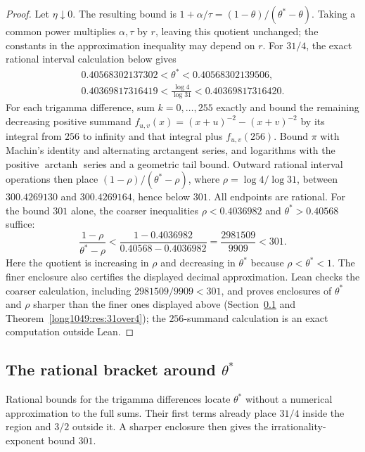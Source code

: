 \documentclass[11pt]{article}
\begin{document}
\begin{proof}
Let $\eta\downarrow0$.  The resulting bound is
$1+\alpha/\tau=(1-\theta)/(\theta^*-\theta)$.
Taking a common power multiplies $\alpha,\tau$ by $r$, leaving this quotient
unchanged; the constants in the approximation inequality may depend on $r$.
For $31/4$, the exact rational interval calculation below gives
\[
\begin{gathered}
 0.40568302137302<\theta^*<0.40568302139506,\\
 0.40369817316419<\frac{\log4}{\log31}<0.40369817316420.
\end{gathered}
\]
For each trigamma difference, sum $k=0,\ldots,255$ exactly and bound the
remaining decreasing positive summand $f_{u,v}(x)=(x+u)^{-2}-(x+v)^{-2}$
by its integral from $256$ to infinity and that integral plus $f_{u,v}(256)$.
Bound $\pi$ with Machin's identity and alternating arctangent series,
and logarithms with the positive $\operatorname{arctanh}$ series and a
geometric tail bound. Outward rational interval operations then place
$(1-\rho)/(\theta^*-\rho)$, where $\rho=\log4/\log31$,
between $300.4269130$ and $300.4269164$, hence below $301$.
All endpoints are rational. For the bound $301$ alone, the coarser
inequalities $\rho<0.4036982$ and $\theta^*>0.40568$ suffice:
\[
 \frac{1-\rho}{\theta^*-\rho}
 <\frac{1-0.4036982}{0.40568-0.4036982}
 =\frac{2981509}{9909}<301.
\]
Here the quotient is increasing in $\rho$ and decreasing in $\theta^*$
because $\rho<\theta^*<1$. The finer enclosure also certifies the
displayed decimal approximation. Lean checks the coarser calculation,
including $2981509/9909<301$, and proves enclosures of $\theta^*$ and
$\rho$ sharper than the finer ones displayed above
(Section~\ref{long1049:sec:regionbracket} and
Theorem~\ref{long1049:res:31over4}); the $256$-summand calculation is an
exact computation outside Lean.
\end{proof}

\subsection{The rational bracket around \texorpdfstring{$\theta^{*}$}{theta*}}\label{long1049:sec:regionbracket}

Rational bounds for the trigamma differences locate $\theta^*$
without a numerical approximation to the full sums. Their first
terms already place $31/4$ inside the region and $3/2$ outside it.
A sharper enclosure then gives the irrationality-exponent bound
$301$.
\end{document}
